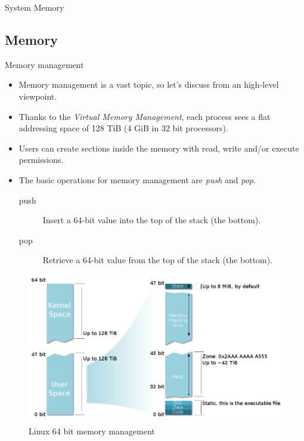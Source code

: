\begin{frame}{System Memory}
	\subsection{Memory}
	\begin{block}{Memory management}
		\begin{itemize}
			\item Memory management is a vast topic, so let's discuss from an high-level viewpoint.
			\item Thanks to the \emph{Virtual Memory Management}, each process sees a
				flat addressing space of 128 TiB (4 GiB in 32 bit processors).
			\item Users can create sections inside the memory with read, write and/or
				execute permissions.
			\item The basic operations for memory management are \emph{push} and \emph{pop}.
				\begin{description}
					\item[push]Insert a 64-bit value into the top of the stack (the bottom).
					\item[pop]Retrieve a 64-bit value from the top of the stack (the bottom).
				\end{description}
		\end{itemize}
	\end{block}
\end{frame}

\begin{frame}
	\begin{figure}
		\centering
		\includegraphics[width=\textwidth]{imgs/memory.png}
		\caption{Linux 64 bit memory management}
		\label{fig:mem}
	\end{figure}
\end{frame}

